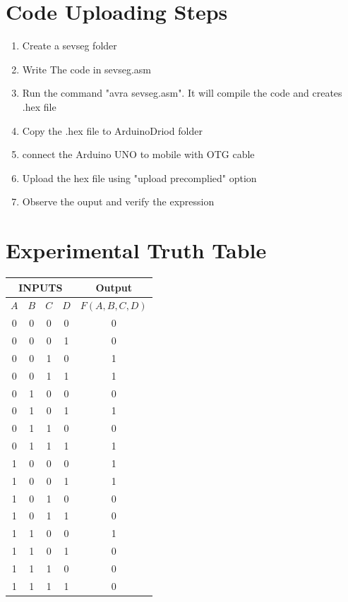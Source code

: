 \documentclass[a4paper,12pt]{article}
\begin{document}
\section*{Code Uploading Steps}
\begin{enumerate}
        \item Create a sevseg folder
        \item Write The code in sevseg.asm
        \item Run the command "avra sevseg.asm". It will compile the code and creates .hex file
        \item Copy the .hex file to ArduinoDriod folder
        \item connect the Arduino UNO to mobile with OTG cable
        \item Upload the hex file using "upload precomplied" option
        \item Observe the ouput and verify the expression
\end{enumerate}
\section*{Experimental Truth Table}
\begin{center}
\begin{tabular}{|c|c|c|c|c|}
\hline
\multicolumn{4}{|c|}{\textbf{INPUTS}} & \textbf{Output} \\
\hline
$A$ & $B$ & $C$ & $D$ & $F(A,B,C,D)$ \\
\hline
0 & 0 & 0 & 0 & 0 \\ 
0 & 0 & 0 & 1 & 0 \\ 
0 & 0 & 1 & 0 & 1 \\ 
0 & 0 & 1 & 1 & 1 \\ 
0 & 1 & 0 & 0 & 0 \\ 
0 & 1 & 0 & 1 & 1 \\ 
0 & 1 & 1 & 0 & 0 \\ 
0 & 1 & 1 & 1 & 1 \\ 
1 & 0 & 0 & 0 & 1 \\ 
1 & 0 & 0 & 1 & 1 \\ 
1 & 0 & 1 & 0 & 0 \\ 
1 & 0 & 1 & 1 & 0 \\ 
1 & 1 & 0 & 0 & 1 \\ 
1 & 1 & 0 & 1 & 0 \\ 
1 & 1 & 1 & 0 & 0 \\ 
1 & 1 & 1 & 1 & 0 \\ 
\hline
\end{tabular}
\end{center}
\end{document}
